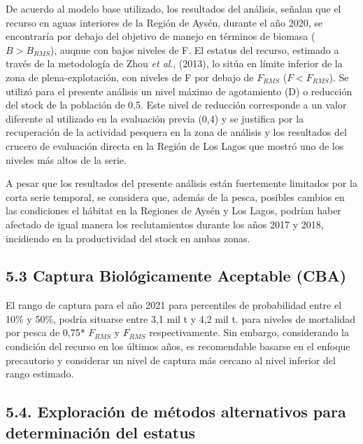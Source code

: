 \documentclass[
  spanish,
]{article}
\begin{document}
De acuerdo al modelo base utilizado, los resultados del análisis,
señalan que el recurso en aguas interiores de la Región de Aysén,
durante el año 2020, se encontraría por debajo del objetivo de manejo en
términos de biomasa (\(B>B_{RMS}\)), auqnue con bajos niveles de F. El
estatus del recurso, estimado a través de la metodología de Zhou
\emph{et al}., (2013), lo sitúa en límite inferior de la zona de
plena-explotación, con niveles de F por debajo de \(F_{RMS}\)
(\(F< F_{RMS}\)). Se utilizó para el presente análisis un nivel máximo
de agotamiento (D) o reducción del stock de la población de 0,5. Este
nivel de reducción corresponde a un valor diferente al utilizado en la
evaluación previa (0,4) y se justifica por la recuperación de la
actividad pesquera en la zona de análisis y los resultados del crucero
de evaluación directa en la Región de Los Lagos que mostró uno de los
niveles más altos de la serie.

A pesar que los resultados del presente análisis están fuertemente
limitados por la corta serie temporal, se considera que, además de la
pesca, posibles cambios en las condiciones el hábitat en la Regiones de
Aysén y Los Lagos, podrían haber afectado de igual manera los
reclutamientos durante los años 2017 y 2018, incidiendo en la
productividad del stock en ambas zonas.

\hypertarget{captura-bioluxf3gicamente-aceptable-cba-1}{%
\subsection{5.3 Captura Biológicamente Aceptable
(CBA)}\label{captura-bioluxf3gicamente-aceptable-cba-1}}

El rango de captura para el año 2021 para percentiles de probabilidad
entre el 10\% y 50\%, podría situarse entre 3,1 mil t y 4,2 mil t. para
niveles de mortalidad por pesca de 0,75* \(F_{RMS}\) y \(F_{RMS}\)
respectivamente. Sin embargo, considerando la condición del recurso en
los últimos años, es recomendable basarse en el enfoque precautorio y
considerar un nivel de captura más cercano al nivel inferior del rango
estimado.

\hypertarget{exploraciuxf3n-de-muxe9todos-alternativos-para-determinaciuxf3n-del-estatus}{%
\subsection{5.4. Exploración de métodos alternativos para determinación
del
estatus}\label{exploraciuxf3n-de-muxe9todos-alternativos-para-determinaciuxf3n-del-estatus}}
\end{document}
